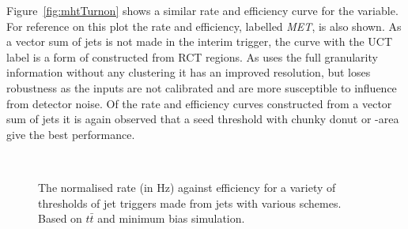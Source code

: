 Figure~\ref{fig:mhtTurnon} shows a similar rate and efficiency curve
for the \MHT variable. For reference on this plot the \MET rate and
efficiency, labelled \emph{MET}, is also shown. As a
vector sum of jets is not made in the interim trigger, the curve with
the UCT label is a form of \MET constructed from RCT regions. As \MET
uses the full granularity \TT information without any clustering it
has an improved resolution, but loses robustness as the inputs are not
calibrated and are more susceptible to influence from detector noise.
Of the rate and efficiency curves constructed from a vector sum of
jets it is again observed that a seed threshold with chunky donut or
\rho-area \PUS give the best performance.

\begin{figure}
  \centering
  \\ 
  \caption{ The normalised rate (in Hz) against efficiency for a
  variety of thresholds of jet triggers
  made from jets with various \PUS schemes. Based on $t\bar{t}$ and
  minimum bias \MC simulation.}
  \label{fig:rateEffJet}
\end{figure}

